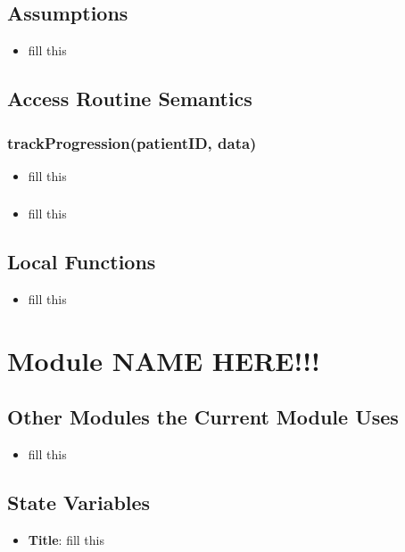 \documentclass[12pt, titlepage]{article}
\begin{document}
\subsection{Assumptions}
\begin{itemize}
    \item fill this
\end{itemize}

\subsection{Access Routine Semantics}
\subsubsection{trackProgression(patientID, data)}

\begin{itemize}
    \item fill this
\end{itemize}

\subsubsection{}

\begin{itemize}
    \item fill this
\end{itemize}


\subsection{Local Functions}
\begin{itemize}
    \item fill this
\end{itemize}
\section{Module NAME HERE!!!}

\subsection{Other Modules the Current Module Uses}
\begin{itemize}
    \item fill this 
\end{itemize}

\subsection{State Variables}
\begin{itemize}
    \item \textbf{Title}: fill this 
\end{itemize}
\end{document}
